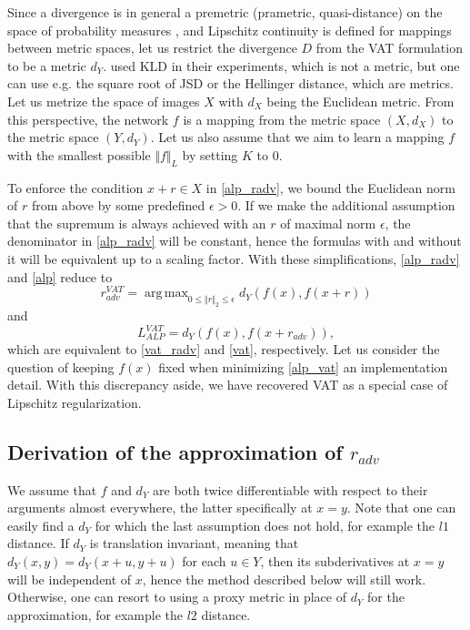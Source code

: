 \documentclass{article}
\DeclareMathOperator*{\argmax}{arg\,max}
\begin{document}
Since a divergence is in general a premetric (prametric, quasi-distance) on the space of probability measures \citep{Deza2009}, and Lipschitz continuity is defined for mappings between metric spaces, let us restrict the divergence $D$ from the VAT formulation to be a metric $d_Y$. \citet{Miyatoetal2017} used KLD in their experiments, which is not a metric, but one can use e.g. the square root of JSD or the Hellinger distance, which are metrics. Let us metrize the space of images $X$ with $d_X$ being the Euclidean metric. From this perspective, the network $f$ is a mapping from the metric space $(X, d_X)$ to the metric space $(Y, d_Y)$. Let us also assume that we aim to learn a mapping $f$ with the smallest possible $\Vert{f}\Vert_L$ by setting $K$ to $0$.

To enforce the condition $x+r\in X$ in \eqref{alp_radv}, we bound the Euclidean norm of $r$ from above by some predefined $\epsilon>0$. If we make the additional assumption that the supremum is always achieved with an $r$ of maximal norm $\epsilon$, the denominator in \eqref{alp_radv} will be constant, hence the formulas with and without it will be equivalent up to a scaling factor. With these simplifications, \eqref{alp_radv} and \eqref{alp} reduce to 
\begin{equation} \label{alp_radv_vat}
r_{adv}^{VAT}=\argmax_{0 \leq \Vert r\Vert_2\leq \epsilon}{d_Y(f(x),f(x+r))}
\end{equation}
and
\begin{equation} \label{alp_vat}
L_{ALP}^{VAT}=d_Y(f(x),f(x+r_{adv})),
\end{equation}
which are equivalent to \eqref{vat_radv} and \eqref{vat}, respectively. Let us consider the question of keeping $f(x)$ fixed when minimizing \eqref{alp_vat} an implementation detail. With this discrepancy aside, we have recovered VAT as a special case of Lipschitz regularization.

\subsection{Derivation of the approximation of $r_{adv}$} \label{r_adv_derivation}
We assume that $f$ and $d_Y$ are both twice differentiable with respect to their arguments almost everywhere, the latter specifically at $x=y$. Note that one can easily find a $d_Y$ for which the last assumption does not hold, for example the $l1$ distance. If $d_Y$ is translation invariant, meaning that $d_Y(x,y)=d_Y(x+u,y+u)$ for each $u\in Y$, then its subderivatives at $x=y$ will be independent of $x$, hence the method described below will still work. Otherwise, one can resort to using a proxy metric in place of $d_Y$ for the approximation, for example the $l2$ distance.
\end{document}

